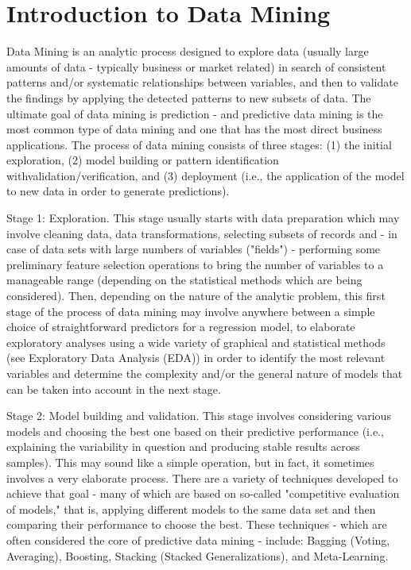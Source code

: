 \documentclass[]{report}
\begin{document}
\section{Introduction to Data Mining}

Data Mining is an analytic process designed to explore data (usually large amounts of data - typically business or market related) in search of consistent patterns and/or systematic relationships between variables, and then to validate the findings by applying the detected patterns to new subsets of data. The ultimate goal of data mining is prediction - and predictive data mining is the most common type of data mining and one that has the most direct business applications. The process of data mining consists of three stages: (1) the initial exploration, (2) model building or pattern identification withvalidation/verification, and (3) deployment (i.e., the application of the model to new data in order to generate predictions).


Stage 1: Exploration. This stage usually starts with data preparation which may involve cleaning data, data transformations, selecting subsets of records and - in case of data sets with large numbers of variables ("fields") - performing some preliminary feature selection operations to bring the number of variables to a manageable range (depending on the statistical methods which are being considered). Then, depending on the nature of the analytic problem, this first stage of the process of data mining may involve anywhere between a simple choice of straightforward predictors for a regression model, to elaborate exploratory analyses using a wide variety of graphical and statistical methods (see Exploratory Data Analysis (EDA)) in order to identify the most relevant variables and determine the complexity and/or the general nature of models that can be taken into account in the next stage.

Stage 2: Model building and validation. This stage involves considering various models and choosing the best one based on their predictive performance (i.e., explaining the variability in question and producing stable results across samples). This may sound like a simple operation, but in fact, it sometimes involves a very elaborate process. There are a variety of techniques developed to achieve that goal - many of which are based on so-called "competitive evaluation of models," that is, applying different models to the same data set and then comparing their performance to choose the best. These techniques - which are often considered the core of predictive data mining - include: Bagging (Voting, Averaging), Boosting, Stacking (Stacked Generalizations), and Meta-Learning.
\end{document}

